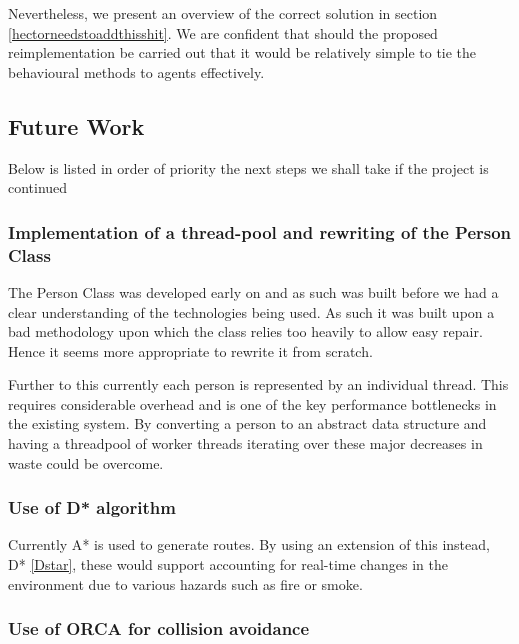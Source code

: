 Nevertheless, we present an overview of the correct solution in section \ref{hectorneedstoaddthisshit}. We are confident that should the proposed reimplementation be carried out that it would be relatively simple to tie the behavioural methods to agents effectively.










\subsection{Future Work}

Below is listed in order of priority the next steps we shall take
if the project is continued


\subsubsection{Implementation of a thread-pool and rewriting of the Person Class}

The Person Class was developed early on and as such was built before
we had a clear understanding of the technologies being used. As such
it was built upon a bad methodology upon which the class relies too
heavily to allow easy repair. Hence it seems more appropriate to rewrite
it from scratch.

Further to this currently each person is represented by an individual
thread. This requires considerable overhead and is one of the key
performance bottlenecks in the existing system. By converting a person
to an abstract data structure and having a threadpool of worker threads
iterating over these major decreases in waste could be overcome.


\subsubsection{Use of D{*} algorithm}

Currently A{*} is used to generate routes. By using an extension of this instead, D{*} \ref{Dstar}, these would support accounting for real-time changes in the environment due to various hazards such as fire or smoke.


\subsubsection{Use of ORCA for collision avoidance}

